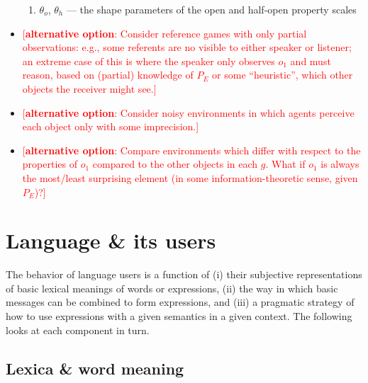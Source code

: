 \documentclass[fleqn,reqno,12pt]{article}
\newcommand{\optional}[1]{\textcolor{Red}{[\textbf{alternative option}: #1]}}
\begin{document}
\begin{itemize}
\begin{enumerate}
  \item $\theta_o$, $\theta_h$ --- the shape parameters of the open and half-open property scales
  \end{enumerate}
\item \optional{Consider reference games with only partial observations: e.g., some referents
    are no visible to either speaker or listener; an extreme case of this is where the speaker
    only observes $o_1$ and must reason, based on (partial) knowledge of $P_E$ or some
    ``heuristic'', which other objects the receiver might see.}
\item \optional{Consider noisy environments in which agents perceive each object only with some
  imprecision.}
\item \optional{Compare environments which differ with respect to the properties of $o_1$
    compared to the other objects in each $g$. What if $o_1$ is always the most/least
    surprising element (in some information-theoretic sense, given $P_E$)?}
\end{itemize}

\section{Language \& its users}
\label{sec:language-users}

The behavior of language users is a function of (i) their subjective representations of basic
lexical meanings of words or expressions, (ii) the way in which basic messages can be combined
to form expressions, and (iii) a pragmatic strategy of how to use expressions with a given
semantics in a given context. The following looks at each component in turn.

\subsection{Lexica \& word meaning}
\label{sec:lexica--semantic}
\end{document}
